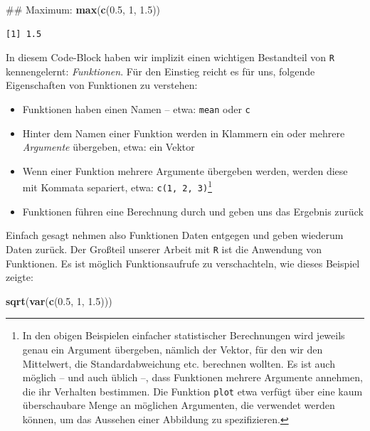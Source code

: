 \documentclass[12pt,]{tufte-book}
\newenvironment{Shaded}{\begin{snugshade}}{\end{snugshade}}
\newcommand{\KeywordTok}[1]{\textcolor[rgb]{0.13,0.29,0.53}{\textbf{#1}}}
\newcommand{\DecValTok}[1]{\textcolor[rgb]{0.00,0.00,0.81}{#1}}
\newcommand{\FloatTok}[1]{\textcolor[rgb]{0.00,0.00,0.81}{#1}}
\newcommand{\NormalTok}[1]{#1}
\providecommand{\tightlist}{%
  \setlength{\itemsep}{0pt}\setlength{\parskip}{0pt}}
\theoremstyle{definition}
\theoremstyle{definition}
\theoremstyle{definition}
\theoremstyle{remark}
\begin{document}
\begin{Shaded}
\begin{Highlighting}[]
\NormalTok{## Maximum:}
\KeywordTok{max}\NormalTok{(}\KeywordTok{c}\NormalTok{(}\FloatTok{0.5}\NormalTok{, }\DecValTok{1}\NormalTok{, }\FloatTok{1.5}\NormalTok{))}
\end{Highlighting}
\end{Shaded}

\begin{verbatim}
[1] 1.5
\end{verbatim}

In diesem Code-Block haben wir implizit einen wichtigen Bestandteil von
\texttt{R} kennengelernt: \emph{Funktionen}. Für den Einstieg reicht es
für uns, folgende Eigenschaften von Funktionen zu verstehen:

\begin{itemize}
\tightlist
\item
  Funktionen haben einen Namen -- etwa: \texttt{mean} oder \texttt{c}
\item
  Hinter dem Namen einer Funktion werden in Klammern ein oder mehrere
  \emph{Argumente} übergeben, etwa: ein Vektor
\item
  Wenn einer Funktion mehrere Argumente übergeben werden, werden diese
  mit Kommata separiert, etwa: \texttt{c(1,\ 2,\ 3)}\footnote{In den
    obigen Beispielen einfacher statistischer Berechnungen wird jeweils
    genau ein Argument übergeben, nämlich der Vektor, für den wir den
    Mittelwert, die Standardabweichung etc. berechnen wollten. Es ist
    auch möglich -- und auch üblich --, dass Funktionen mehrere
    Argumente annehmen, die ihr Verhalten bestimmen. Die Funktion
    \texttt{plot} etwa verfügt über eine kaum überschaubare Menge an
    möglichen Argumenten, die verwendet werden können, um das Aussehen
    einer Abbildung zu spezifizieren.}
\item
  Funktionen führen eine Berechnung durch und geben uns das Ergebnis
  zurück
\end{itemize}

Einfach gesagt nehmen also Funktionen Daten entgegen und geben wiederum
Daten zurück. Der Großteil unserer Arbeit mit \texttt{R} ist die
Anwendung von Funktionen. Es ist möglich Funktionsaufrufe zu
verschachteln, wie dieses Beispiel zeigte:

\begin{Shaded}
\begin{Highlighting}[]
\KeywordTok{sqrt}\NormalTok{(}\KeywordTok{var}\NormalTok{(}\KeywordTok{c}\NormalTok{(}\FloatTok{0.5}\NormalTok{, }\DecValTok{1}\NormalTok{, }\FloatTok{1.5}\NormalTok{)))}
\end{Highlighting}
\end{Shaded}
\end{document}
